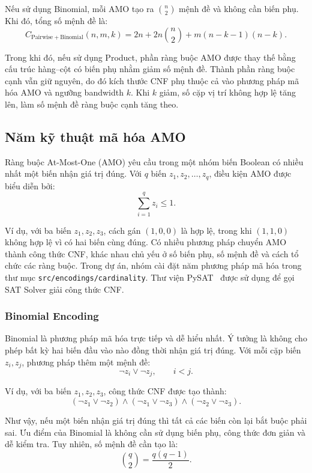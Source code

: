 \documentclass[a4paper,fleqn]{cas-sc}
\newcommand{\code}[1]{\nolinkurl{#1}}
\begin{document}
Nếu sử dụng Binomial, mỗi AMO tạo ra $\binom{n}{2}$ mệnh đề và không cần biến phụ. Khi đó, tổng số mệnh đề là:
\begin{equation}
C_{\mathrm{Pairwise+Binomial}}(n,m,k)
=2n+2n\binom{n}{2}+m(n-k-1)(n-k).
\end{equation}

Trong khi đó, nếu sử dụng Product, phần ràng buộc AMO được thay thế bằng cấu trúc hàng--cột có biến phụ nhằm giảm số mệnh đề. Thành phần ràng buộc cạnh vẫn giữ nguyên, do đó kích thước CNF phụ thuộc cả vào phương pháp mã hóa AMO và ngưỡng bandwidth $k$. Khi $k$ giảm, số cặp vị trí không hợp lệ tăng lên, làm số mệnh đề ràng buộc cạnh tăng theo.

\subsection{Năm kỹ thuật mã hóa AMO}

Ràng buộc At-Most-One (AMO) yêu cầu trong một nhóm biến Boolean có nhiều nhất một biến nhận giá trị đúng. Với $q$ biến $z_1,z_2,\ldots,z_q$, điều kiện AMO được biểu diễn bởi:
\[
\sum_{i=1}^{q}z_i\leq 1.
\]

Ví dụ, với ba biến $z_1,z_2,z_3$, cách gán $(1,0,0)$ là hợp lệ, trong khi $(1,1,0)$ không hợp lệ vì có hai biến cùng đúng. Có nhiều phương pháp chuyển AMO thành công thức CNF, khác nhau chủ yếu ở số biến phụ, số mệnh đề và cách tổ chức các ràng buộc. Trong dự án, nhóm cài đặt năm phương pháp mã hóa trong thư mục \code{src/encodings/cardinality}. Thư viện PySAT~\cite{pysat} được sử dụng để gọi SAT Solver giải công thức CNF.

\subsubsection{Binomial Encoding}

Binomial là phương pháp mã hóa trực tiếp và dễ hiểu nhất. Ý tưởng là không cho phép bất kỳ hai biến đầu vào nào đồng thời nhận giá trị đúng. Với mỗi cặp biến $z_i,z_j$, phương pháp thêm một mệnh đề:
\[
\neg z_i\lor\neg z_j,\qquad i<j.
\]

Ví dụ, với ba biến $z_1,z_2,z_3$, công thức CNF được tạo thành:
\[
(\neg z_1\lor\neg z_2)\land(\neg z_1\lor\neg z_3)\land(\neg z_2\lor\neg z_3).
\]

Như vậy, nếu một biến nhận giá trị đúng thì tất cả các biến còn lại bắt buộc phải sai. Ưu điểm của Binomial là không cần sử dụng biến phụ, công thức đơn giản và dễ kiểm tra. Tuy nhiên, số mệnh đề cần tạo là:
\[
\binom{q}{2}=\frac{q(q-1)}{2}.
\]
\end{document}
